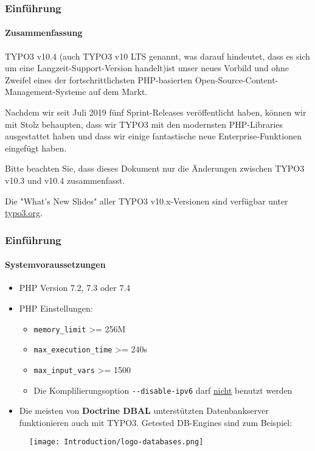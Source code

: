 \begin{frame}[fragile]
	\frametitle{Einführung}
	\framesubtitle{Zusammenfassung}

	\small
		TYPO3 v10.4 (auch TYPO3 v10 LTS genannt, was darauf hindeutet, dass es sich um eine Langzeit-Support-Version 		     handelt)ist unser neues Vorbild und ohne Zweifel eines der fortschrittlichsten PHP-basierten Open-Source-Content- Management-Systeme auf dem Markt.

		\vspace{0.2cm}

		Nachdem wir seit Juli 2019 fünf Sprint-Releases veröffentlicht haben, können wir mit Stolz behaupten,
		dass wir TYPO3 mit den modernsten PHP-Libraries ausgestattet haben und dass wir einige fantastische neue
		Enterprise-Funktionen eingefügt haben.

		\vspace{0.2cm}

		Bitte beachten Sie, dass dieses Dokument nur die Änderungen zwischen TYPO3 v10.3 und v10.4 zusammenfasst.

		\vspace{0.2cm}

		Die "What's New Slides" aller TYPO3 v10.x-Versionen sind verfügbar unter
		\href{https://typo3.org/help/documentation/whats-new/}{typo3.org}.

	\normalsize

\end{frame}


\begin{frame}[fragile]
	\frametitle{Einführung}
	\framesubtitle{Systemvoraussetzungen}

	\begin{itemize}
		\item PHP Version 7.2, 7.3 oder 7.4
		\item PHP Einstellungen:

			\begin{itemize}
				\item \texttt{memory\_limit} >= 256M
				\item \texttt{max\_execution\_time} >= 240s
				\item \texttt{max\_input\_vars} >= 1500
				\item Die Komplilierungsoption \texttt{-}\texttt{-disable-ipv6} darf \underline{nicht} benutzt werden
			\end{itemize}

		\item Die meisten von \textbf{Doctrine DBAL} unterstützten Datenbankserver funktionieren auch mit TYPO3.
			Getested DB-Engines sind zum Beispiel:
	\end{itemize}

	\begin{figure}
		\texttt{[image: Introduction/logo-databases.png]}
	\end{figure}

\end{frame}

